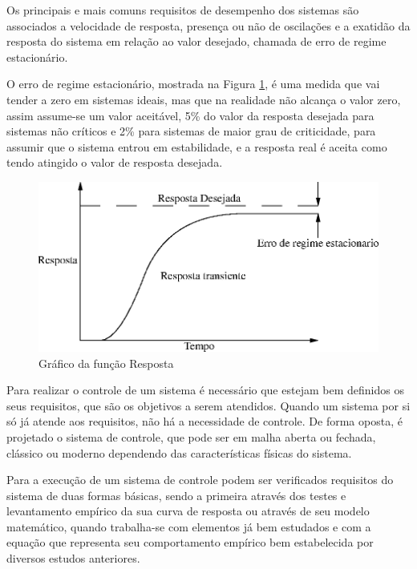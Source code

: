 Os principais e mais comuns requisitos de desempenho dos sistemas são associados a velocidade de resposta, presença ou não de oscilações e a exatidão da resposta do sistema em relação ao valor desejado, chamada de erro de regime estacionário.

O erro de regime estacionário, mostrada na Figura \ref{fig:funcaoResposta}, é uma medida que vai tender a zero em sistemas ideais, mas que na realidade não alcança o valor zero, assim assume-se um valor aceitável, 5\% do valor da resposta desejada para sistemas não críticos e 2\% para sistemas de maior grau de criticidade, para assumir que o sistema entrou em estabilidade, e a resposta real é aceita como tendo atingido o valor de resposta desejada. 

\begin{figure}[!htb]
\center\includegraphics[scale=1]{./pic/C400grafico.eps}
\caption{Gráfico da função Resposta}
\label{fig:funcaoResposta}
\end{figure}

Para realizar o controle de um sistema é necessário que estejam bem definidos os seus requisitos, que são os objetivos a serem atendidos. Quando um sistema por si só já atende aos requisitos, não há a necessidade de controle. De forma oposta, é projetado o sistema de controle, que pode ser em malha aberta ou fechada, clássico ou moderno dependendo das características físicas do sistema. 

Para a execução de um sistema de controle podem ser verificados requisitos do sistema de duas formas básicas, sendo a primeira através dos testes e levantamento empírico da sua curva de resposta ou através de seu modelo matemático, quando trabalha-se com elementos já bem estudados e com a equação que representa seu comportamento empírico bem estabelecida por diversos estudos anteriores.



